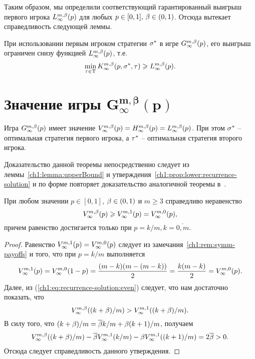 {Таким образом, мы определили соответствующий гарантированный выигрыш первого игрока $\L*{\infty}(p)$ для любых $p \in [0, 1], \, \beta \in (0, 1)$.
Отсюда вытекает справедливость следующей леммы.

\begin{lemma}
  \label{ch1:lemma:first:lower}
  При использовании первым игроком стратегии $\sigma^*$ в игре $\theG*{\infty}(p)$\textup{,} его выигрыш ограничен снизу функцией $\L*{\infty}(p)$\textup{,} т.е.
  \[
    \min_{\taur \in \Tau} \K*{\infty}(p, \sigmar^*, \taur) \geq \L*{\infty}(p).
  \]
\end{lemma}

\section{Значение игры $\mathbf{G^{m,\beta}_\infty(p)}$}\label{ch1:game-value}

\begin{theorem}
  Игра $\theG*{\infty}(p)$ имеет значение $\V*{\infty}(p) = \H*{\infty}(p) = \L*{\infty}(p)$.
  При этом $\sigma^*$ -- оптимальная стратегия первого игрока\textup{,} а $\tau^*$ -- оптимальная стратегия второго игрока.
\end{theorem}
Доказательство данной теоремы непосредственно следует из леммы~\ref{ch1:lemma:upperBound} и утверждения~\ref{ch1:prop:lower:recurrence-solution} и по форме повторяет доказательство аналогичной теоремы в~\cite{domansky07}.

\begin{proposition}
  \label{ch1:prop:value-comparison}
  При любом значении $p \in [0,1]$, $\beta \in (0,1)$ и $m \geq 3$ справедливо неравенство
  \begin{equation*}
    \V*[\Co]{\infty}(p) \geq \V*[1]{\infty}(p) = \V*[0]{\infty}(p),
  \end{equation*}
  причем равенство достигается только при $p = k/m, k = \overline{0,m}$.
\end{proposition}
\begin{proof}
  Равенство $\V*[1]{\infty}(p) = \V*[0]{\infty}(p)$ следует из замечания~\ref{ch1:rem:symm-payoffs} и того, что при $p = k/m$ выполняется
  \begin{equation*}
    \V*[1]{\infty}(p) = \V*[0]{\infty}(1-p) = \frac{(m-k)(m-(m-k))}{2} = \frac{k(m-k)}{2} = \V*[0]{\infty}(p).
  \end{equation*}
  Далее, из (\ref{ch1:eq:recurrence-solution:even}) следует, что нам достаточно показать, что 
  \[
    \V*[\Co]{\infty}((k+\Co)/m) > \V*[1]{\infty}((k+\Co)/m).
  \]
  В силу того, что $(k+\beta)/m = {{\overline{\beta}}} k/m + \beta (k+1)/m$, получаем
  \begin{gather*}
    \V*[\Co]{\infty}((k+\beta)/m) - \DCo \V*[1]{\infty}(k/m) - \Co \V*[1]{\infty}((k+1)/m) = 2\DCo > 0.
  \end{gather*}
  Отсюда следует справедливость данного утверждения.
\end{proof}

}
